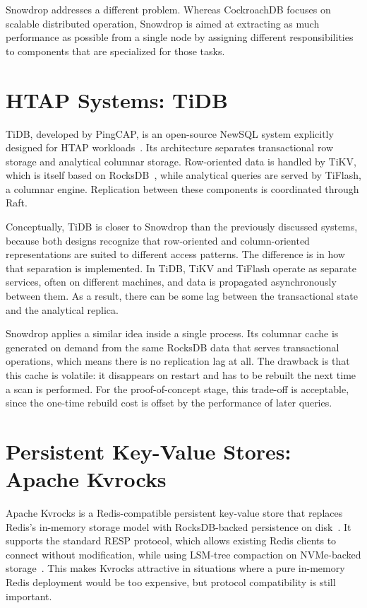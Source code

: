 Snowdrop addresses a different problem. Whereas CockroachDB focuses on scalable distributed operation, Snowdrop is aimed at extracting as much performance as possible from a single node by assigning different responsibilities to components that are specialized for those tasks.

\section{HTAP Systems: TiDB}

TiDB, developed by PingCAP, is an open-source NewSQL system explicitly designed for HTAP workloads~\cite{tidb2025}. Its architecture separates transactional row storage and analytical columnar storage. Row-oriented data is handled by TiKV, which is itself based on RocksDB~\cite{matsunobu2020}, while analytical queries are served by TiFlash, a columnar engine. Replication between these components is coordinated through Raft.

Conceptually, TiDB is closer to Snowdrop than the previously discussed systems, because both designs recognize that row-oriented and column-oriented representations are suited to different access patterns. The difference is in how that separation is implemented. In TiDB, TiKV and TiFlash operate as separate services, often on different machines, and data is propagated asynchronously between them. As a result, there can be some lag between the transactional state and the analytical replica.

Snowdrop applies a similar idea inside a single process. Its columnar cache is generated on demand from the same RocksDB data that serves transactional operations, which means there is no replication lag at all. The drawback is that this cache is volatile: it disappears on restart and has to be rebuilt the next time a scan is performed. For the proof-of-concept stage, this trade-off is acceptable, since the one-time rebuild cost is offset by the performance of later queries.

\section{Persistent Key-Value Stores: Apache Kvrocks}

Apache Kvrocks is a Redis-compatible persistent key-value store that replaces Redis’s in-memory storage model with RocksDB-backed persistence on disk~\cite{kvrocks2025}. It supports the standard RESP protocol, which allows existing Redis clients to connect without modification, while using LSM-tree compaction on NVMe-backed storage~\cite{oneil1996}. This makes Kvrocks attractive in situations where a pure in-memory Redis deployment would be too expensive, but protocol compatibility is still important.

